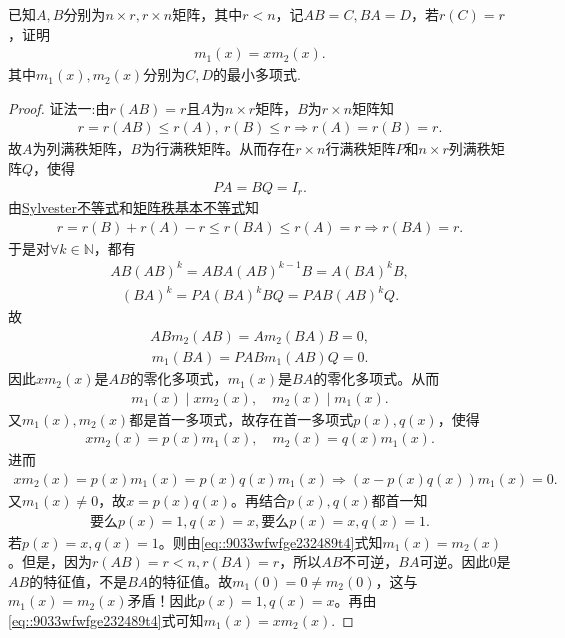 \documentclass[../../main.tex]{subfiles}%
\begin{document}
\begin{example}
已知$A,B$分别为$n \times r,r \times n$矩阵，其中$r < n$，记$AB=C,BA=D$，若$r(C)=r$，证明
\begin{align*}
m_1(x) = x m_2(x).
\end{align*}
其中$m_1(x),m_2(x)$分别为$C,D$的最小多项式.
\end{example}
\begin{proof}

{\color{blue}证法一:}由$r(AB) = r$且$A$为$n \times r$矩阵，$B$为$r \times n$矩阵知
\begin{align*}
r = r(AB) \leqslant r(A),\ r(B) \leqslant r \Longrightarrow r(A) = r(B) = r.
\end{align*}
故$A$为列满秩矩阵，$B$为行满秩矩阵。从而存在$r \times n$行满秩矩阵$P$和$n \times r$列满秩矩阵$Q$，使得
\begin{align*}
PA = BQ = I_r.
\end{align*}
由\hyperref[proposition:Sylvester(西尔维斯特)不等式]{Sylvester不等式}和\hyperref[proposition:矩阵秩的基本公式]{矩阵秩基本不等式}知
\begin{align*}
r = r(B) + r(A) - r \leqslant r(BA) \leqslant r(A) = r \Longrightarrow r(BA) = r.
\end{align*}
于是对$\forall k \in \mathbb{N}$，都有
\begin{align*}
AB(AB)^k = ABA(AB)^{k-1}B = A(BA)^kB,
\end{align*}
\begin{align*}
(BA)^k = PA(BA)^kBQ = PAB(AB)^kQ.
\end{align*}
故
\begin{align*}
ABm_2(AB) = Am_2(BA)B = 0,
\end{align*}
\begin{align*}
m_1(BA) = PABm_1(AB)Q = 0.
\end{align*}
因此$xm_2(x)$是$AB$的零化多项式，$m_1(x)$是$BA$的零化多项式。从而
\begin{align*}
m_1(x) \mid xm_2(x),\quad m_2(x) \mid m_1(x).
\end{align*}
又$m_1(x), m_2(x)$都是首一多项式，故存在首一多项式$p(x), q(x)$，使得
\begin{align}
xm_2(x) = p(x)m_1(x),\quad m_2(x) = q(x)m_1(x). \label{eq::9033wfwfge232489t4}
\end{align}
进而
\begin{align*}
xm_2(x) = p(x)m_1(x) = p(x)q(x)m_1(x) \Longrightarrow (x - p(x)q(x))m_1(x) = 0.
\end{align*}
又$m_1(x) \ne 0$，故$x = p(x)q(x)$。再结合$p(x), q(x)$都首一知
\begin{align*}
\text{要么}p(x)=1,q(x)=x,\text{要么}p(x)=x,q(x)=1.
\end{align*}
若$p(x) = x, q(x) = 1$。则由\eqref{eq::9033wfwfge232489t4}式知$m_1(x) = m_2(x)$。但是，因为$r(AB) = r < n, r(BA) = r$，所以$AB$不可逆，$BA$可逆。因此$0$是$AB$的特征值，不是$BA$的特征值。故$m_1(0) = 0 \ne m_2(0)$，这与$m_1(x) = m_2(x)$矛盾！因此$p(x) = 1, q(x) = x$。再由\eqref{eq::9033wfwfge232489t4}式可知$m_1(x) = xm_2(x)$.


\end{proof}
\end{document}
